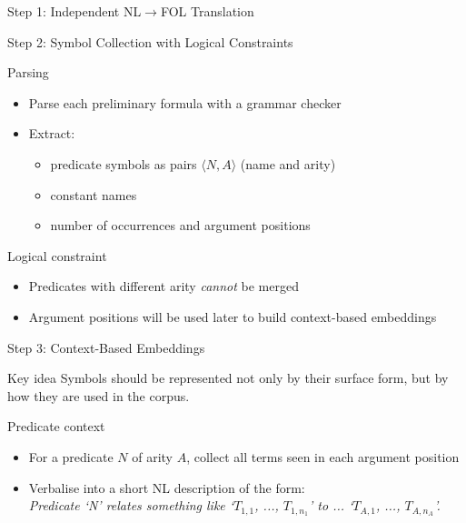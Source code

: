 \documentclass[presentation]{beamer}
\begin{document}
{\begin{frame}{Step 1: Independent NL$\rightarrow$FOL Translation}
\end{frame}

\begin{frame}{Step 2: Symbol Collection with Logical Constraints}

\begin{block}{Parsing}
\begin{itemize}
    \item Parse each preliminary formula with a grammar checker
    \item Extract:
    \begin{itemize}
        \item predicate symbols as pairs $\langle N, A\rangle$ (name and arity)
        \item constant names
        \item number of occurrences and argument positions
    \end{itemize}
\end{itemize}
\end{block}

\begin{block}{Logical constraint}
\begin{itemize}
    \item Predicates with different arity \emph{cannot} be merged
    \item Argument positions will be used later to build context-based embeddings
\end{itemize}
\end{block}

\end{frame}

\begin{frame}{Step 3: Context-Based Embeddings}

\begin{block}{Key idea}
Symbols should be represented not only by their surface form, but by \alert{how they are used} in the corpus.
\end{block}

\begin{block}{Predicate context}
\begin{itemize}
    \item For a predicate $N$ of arity $A$, collect all terms seen in each argument position
    \item Verbalise into a short NL description of the form:\\
    \emph{Predicate `N' relates something like `$T_{1,1}$, ..., $T_{1,n_1}$' to ... `$T_{A,1}$, ..., $T_{A,n_A}$'.}
\end{itemize}
\end{block}


\end{frame}}
\end{document}
